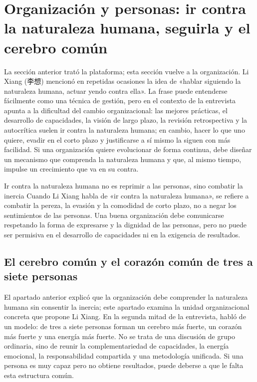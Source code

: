 \section{Organización y personas: ir contra la naturaleza humana, seguirla y el cerebro común}

La sección anterior trató la plataforma; esta sección vuelve a la organización. Li Xiang (李想) mencionó en repetidas ocasiones la idea de «hablar siguiendo la naturaleza humana, actuar yendo contra ella». La frase puede entenderse fácilmente como una técnica de gestión, pero en el contexto de la entrevista apunta a la dificultad del cambio organizacional: las mejores prácticas, el desarrollo de capacidades, la visión de largo plazo, la revisión retrospectiva y la autocrítica suelen ir contra la naturaleza humana; en cambio, hacer lo que uno quiere, evadir en el corto plazo y justificarse a sí mismo la siguen con más facilidad. Si una organización quiere evolucionar de forma continua, debe diseñar un mecanismo que comprenda la naturaleza humana y que, al mismo tiempo, impulse un crecimiento que va en su contra.

\begin{knowledgebox}{Ir contra la naturaleza humana no es reprimir a las personas, sino combatir la inercia}
Cuando Li Xiang habla de «ir contra la naturaleza humana», se refiere a combatir la pereza, la evasión y la comodidad de corto plazo, no a negar los sentimientos de las personas. Una buena organización debe comunicarse respetando la forma de expresarse y la dignidad de las personas, pero no puede ser permisiva en el desarrollo de capacidades ni en la exigencia de resultados.
\end{knowledgebox}

\subsection{El cerebro común y el corazón común de tres a siete personas}

El apartado anterior explicó que la organización debe comprender la naturaleza humana sin consentir la inercia; este apartado examina la unidad organizacional concreta que propone Li Xiang. En la segunda mitad de la entrevista, habló de un modelo: de tres a siete personas forman un cerebro más fuerte, un corazón más fuerte y una energía más fuerte. No se trata de una discusión de grupo ordinaria, sino de reunir la complementariedad de capacidades, la energía emocional, la responsabilidad compartida y una metodología unificada. Si una persona es muy capaz pero no obtiene resultados, puede deberse a que le falta esta estructura común.

